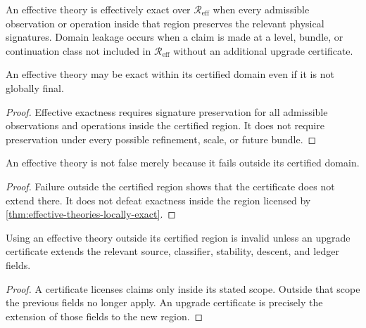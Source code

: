 \begin{definition}
\label{def:effective-exactness-domain-leakage}
An effective theory is effectively exact over $\mathcal R_{\mathrm{eff}}$ when every admissible observation or operation inside that region preserves the relevant physical signatures. Domain leakage occurs when a claim is made at a level, bundle, or continuation class not included in $\mathcal R_{\mathrm{eff}}$ without an additional upgrade certificate.
\end{definition}

\begin{theorem}
\label{thm:effective-theories-locally-exact}
An effective theory may be exact within its certified domain even if it is not globally final.
\end{theorem}

\begin{proof}
Effective exactness requires signature preservation for all admissible observations and operations inside the certified region. It does not require preservation under every possible refinement, scale, or future bundle.
\end{proof}

\begin{corollary}
\label{cor:effective-theories-not-merely-false}
An effective theory is not false merely because it fails outside its certified domain.
\end{corollary}

\begin{proof}
Failure outside the certified region shows that the certificate does not extend there. It does not defeat exactness inside the region licensed by \autoref{thm:effective-theories-locally-exact}.
\end{proof}

\begin{theorem}
\label{thm:domain-leakage-requires-upgrade}
Using an effective theory outside its certified region is invalid unless an upgrade certificate extends the relevant source, classifier, stability, descent, and ledger fields.
\end{theorem}

\begin{proof}
A certificate licenses claims only inside its stated scope. Outside that scope the previous fields no longer apply. An upgrade certificate is precisely the extension of those fields to the new region.
\end{proof}


